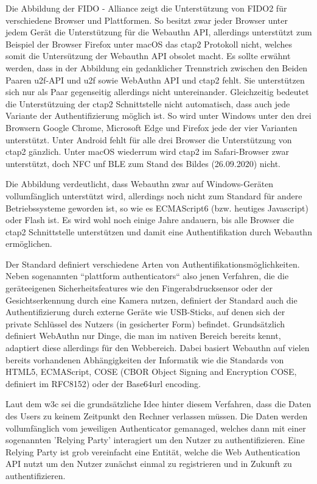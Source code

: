 Die Abbildung der FIDO - Alliance zeigt die Unterstützung von FIDO2 für verschiedene Browser und Plattformen. So besitzt zwar jeder Browser unter jedem Gerät die Unterstützung für die Webauthn API, allerdings unterstützt zum Beispiel der Browser Firefox unter macOS das \ac{ctap}2 Protokoll nicht, welches somit die Untersützung der Webauthn API obsolet macht. Es sollte erwähnt werden, dass in der Abbildung ein gedanklicher Trennstrich zwischen den Beiden Paaren \ac{u2f}-API und \ac{u2f} sowie WebAuthn API und \ac{ctap}2 fehlt. Sie unterstützen sich nur als Paar gegenseitig allerdings nicht untereinander. Gleichzeitig bedeutet die Unterstützuing der \ac{ctap}2 Schnittstelle nicht automatisch, dass auch jede Variante der Authentifizierung möglich ist. So wird unter Windows unter den drei Browsern Google Chrome, Microsoft Edge und Firefox jede der vier Varianten unterstützt. Unter Android fehlt für alle drei Browser die Unterstützung von \ac{ctap}2 gänzlich. Unter macOS wiederrum wird \ac{ctap}2 im Safari-Browser zwar unterstützt, doch NFC unf BLE zum Stand des Bildes (26.09.2020) nicht.
\newpage

Die Abbildung verdeutlicht, dass Webauthn zwar auf Windows-Geräten vollumfänglich unterstützt wird, allerdings noch nicht zum Standard für andere Betriebssysteme geworden ist, so wie es ECMAScript6 (bzw. heutiges Javascript) oder Flash ist. Es wird wohl noch einige Jahre andauern, bis alle Browser die \ac{ctap}2 Schnittstelle unterstützen und damit eine Authentifikation durch Webauthn ermöglichen.

Der Standard definiert verschiedene Arten von Authentifikationsmöglichkeiten. Neben sogenannten ``plattform authenticators`` \cite{A10} also jenen Verfahren, die die geräteeigenen Sicherheitsfeatures wie den Fingerabdrucksensor oder der Gesichtserkennung durch eine Kamera nutzen, definiert der Standard auch die Authentifizierung durch externe Geräte wie USB-Sticks, auf denen sich der private Schlüssel des Nutzers (in gesicherter Form) befindet. Grundsätzlich definiert WebAuthn nur Dinge, die man im nativen Bereich bereits kennt, adaptiert diese allerdings für den Webbereich. Dabei basiert Webauthn auf vielen bereits vorhandenen Abhängigkeiten der Informatik wie die Standards von HTML5, ECMAScript, COSE (CBOR Object Signing and Encryption COSE, definiert im RFC8152) oder der Base64url encoding.

Laut dem \ac{w3c} sei die grundsätzliche Idee hinter diesem Verfahren, dass die Daten des Users zu keinem Zeitpunkt den Rechner verlassen müssen. Die Daten werden vollumfänglich vom jeweiligen Authenticator gemanaged, welches dann mit einer sogenannten 'Relying Party' interagiert um den Nutzer zu authentifizieren. Eine Relying Party ist grob vereinfacht eine Entität, welche die Web Authentication API nutzt um den Nutzer zunächst einmal zu registrieren und in Zukunft zu authentifizieren. \cite{A10}

